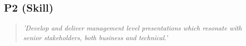 \subsection*{P2 (Skill)}

  \begin{quote}
    \textit{'Develop and deliver management level
    presentations which resonate with senior stakeholders,
    both business and technical.'}
  \end{quote}

\newpage